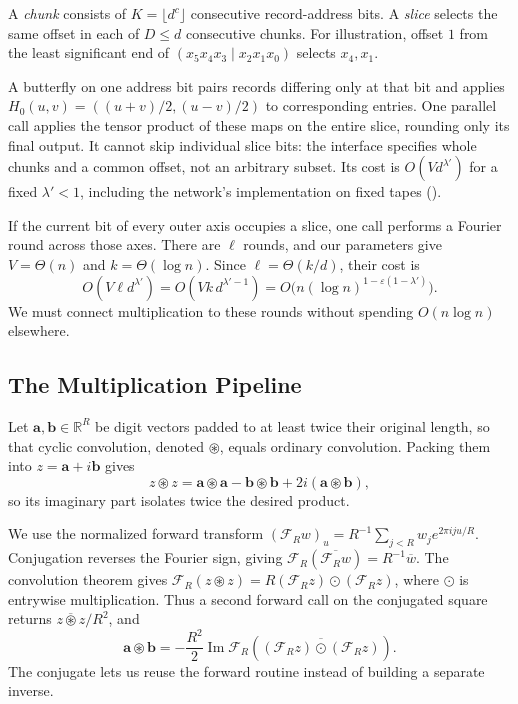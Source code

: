 \documentclass[11pt]{article}
\theoremstyle{definition}
\newcommand{\R}{\mathbb{R}}
\newcommand{\cF}{\mathcal{F}}
\newcommand{\eps}{\varepsilon}
\begin{document}
A \emph{chunk} consists of $K=\lfloor d^c\rfloor$ consecutive record-address bits.
A \emph{slice} selects the same offset in each of $D\le d$ consecutive chunks.
For illustration, offset $1$ from the least significant end of
$(x_5x_4x_3\mid x_2x_1x_0)$ selects $x_4,x_1$.

A butterfly on one address bit pairs records differing only at that bit and applies
$H_0(u,v)=((u+v)/2,(u-v)/2)$ to corresponding entries.
One parallel call applies the tensor product of these maps on the entire slice, rounding only its final output.
It cannot skip individual slice bits: the interface specifies whole chunks and a common offset, not an arbitrary subset.
Its cost is $O(Vd^{\lambda'})$ for a fixed $\lambda'<1$, including the network's implementation on fixed tapes ().

If the current bit of every outer axis occupies a slice, one call performs a Fourier round across those axes.
There are $\ell$ rounds, and our parameters give $V=\Theta(n)$ and $k=\Theta(\log n)$.
Since $\ell=\Theta(k/d)$, their cost is
\[
 O(V\ell d^{\lambda'})
 =O(Vk\,d^{\lambda'-1})
 =O\bigl(n(\log n)^{1-\eps(1-\lambda')}\bigr).
\]
We must connect multiplication to these rounds without spending $O(n\log n)$ elsewhere.

\subsection{The Multiplication Pipeline}

Let $\mathbf a,\mathbf b\in\R^R$ be digit vectors padded to at least twice their original length, so that cyclic convolution, denoted $\circledast$, equals ordinary convolution.
Packing them into $z=\mathbf a+i\mathbf b$ gives
\[
 z\circledast z
 =\mathbf a\circledast\mathbf a-\mathbf b\circledast\mathbf b
   +2i(\mathbf a\circledast\mathbf b),
\]
so its imaginary part isolates twice the desired product.

We use the normalized forward transform
$(\cF_Rw)_u=R^{-1}\sum_{j<R}w_j e^{2\pi iju/R}$.
Conjugation reverses the Fourier sign, giving
$\cF_R(\overline{\cF_Rw})=R^{-1}\overline w$.
The convolution theorem gives
$\cF_R(z\circledast z)=R(\cF_Rz)\odot(\cF_Rz)$, where $\odot$ is entrywise multiplication.
Thus a second forward call on the conjugated square returns $\overline{z\circledast z}/R^2$, and
\[
 \mathbf a\circledast\mathbf b
 =-\frac{R^2}{2}\operatorname{Im}
 \cF_R\!\left(\overline{(\cF_Rz)\odot(\cF_Rz)}\right).
\]
The conjugate lets us reuse the forward routine instead of building a separate inverse.
\end{document}
